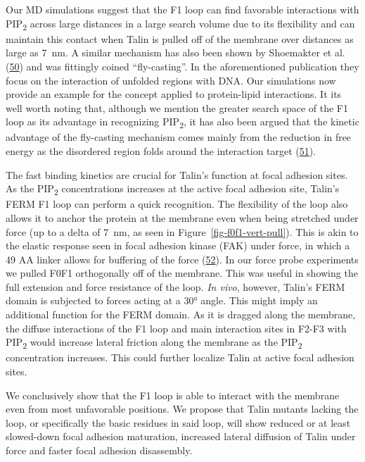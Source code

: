 \documentclass[
  twocolumn]{biophys-new-mod}
\begin{document}
Our MD simulations suggest that the F1 loop can find favorable
interactions with PIP\textsubscript{2} across large distances in a large
search volume due to its flexibility and can maintain this contact when
Talin is pulled off of the membrane over distances as large as 7~nm. A
similar mechanism has also been shown by Shoemakter et al.
(\protect\hyperlink{ref-shoemakerSpeedingMolecularRecognition2000}{50})
and was fittingly coined ``fly-casting''. In the aforementioned
publication they focus on the interaction of unfolded regions with DNA.
Our simulations now provide an example for the concept applied to
protein-lipid interactions. It its well worth noting that, although we
mention the greater search space of the F1 loop as its advantage in
recognizing PIP\textsubscript{2}, it has also been argued that the
kinetic advantage of the fly-casting mechanism comes mainly from the
reduction in free energy as the disordered region folds around the
interaction target
(\protect\hyperlink{ref-huangKineticAdvantageIntrinsically2009}{51}).

The fast binding kinetics are crucial for Talin's function at focal
adhesion sites. As the PIP\textsubscript{2} concentrations increases at
the active focal adhesion site, Talin's FERM F1 loop can perform a quick
recognition. The flexibility of the loop also allows it to anchor the
protein at the membrane even when being stretched under force (up to a
delta of 7~nm, as seen in Figure~\ref{fig-f0f1-vert-pull}). This is akin
to the elastic response seen in focal adhesion kinase (FAK) under force,
in which a 49 AA linker allows for buffering of the force
(\protect\hyperlink{ref-bauerStructuralMechanisticInsights2019}{52}). In
our force probe experiments we pulled F0F1 orthogonally off of the
membrane. This was useful in showing the full extension and force
resistance of the loop. \emph{In vivo}, however, Talin's FERM domain is
subjected to forces acting at a 30° angle. This might imply an
additional function for the FERM domain. As it is dragged along the
membrane, the diffuse interactions of the F1 loop and main interaction
sites in F2-F3 with PIP\textsubscript{2} would increase lateral friction
along the membrane as the PIP\textsubscript{2} concentration increases.
This could further localize Talin at active focal adhesion sites.

We conclusively show that the F1 loop is able to interact with the
membrane even from most unfavorable positions. We propose that Talin
mutants lacking the loop, or specifically the basic residues in said
loop, will show reduced or at least slowed-down focal adhesion
maturation, increased lateral diffusion of Talin under force and faster
focal adhesion disassembly.
\end{document}

